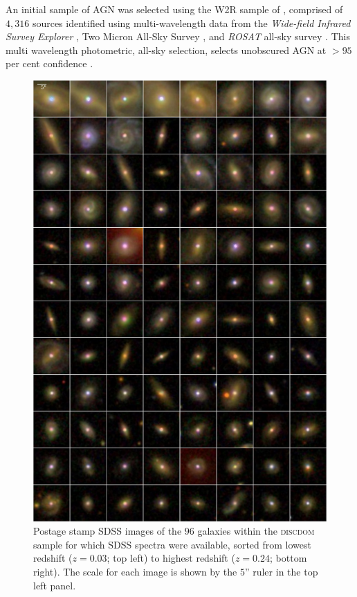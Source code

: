 An initial sample of AGN was selected using the W2R sample of \citet{edelson12}, comprised of $4,316$ sources identified using multi-wavelength data from the \emph{Wide-field Infrared Survey Explorer} \citep[\emph{WISE};][]{wright10}, Two Micron All-Sky Survey \citep[2MASS;][]{skrutskie06}, and \emph{ROSAT} all-sky survey \citep[RASS;][]{voges99}. This multi wavelength photometric, all-sky selection, selects unobscured AGN at $>95$ per cent confidence \citep{edelson12}.


\begin{figure}
\centering
\includegraphics[height=0.9\textheight]{agn/mosaic_all_diskdom_zsort.pdf}
\caption[SDSS images of DISKDOM sample]{Postage stamp SDSS images of the $96$ galaxies within the \textsc{discdom} sample for which SDSS spectra were available, sorted from lowest redshift ($z=0.03$; top left) to highest redshift ($z=0.24$; bottom right). The scale for each image is shown by the $5$'' ruler in the top left panel.}
\label{fig:exampleimages}
\end{figure}


